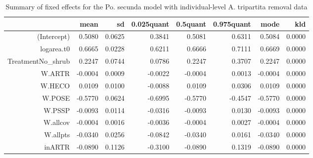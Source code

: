 \begin{table}[ht]
\centering
\caption{Summary of fixed effects for the Po. secunda model with individual-level A. tripartita removal data} 
\label{POSEgrowth-inARTR}
\begin{tabular}{rrrrrrrr}
  \hline
 & mean & sd & 0.025quant & 0.5quant & 0.975quant & mode & kld \\ 
  \hline
(Intercept) & 0.5080 & 0.0625 & 0.3841 & 0.5081 & 0.6311 & 0.5084 & 0.0000 \\ 
  logarea.t0 & 0.6665 & 0.0228 & 0.6211 & 0.6666 & 0.7111 & 0.6669 & 0.0000 \\ 
  TreatmentNo\_shrub & 0.2247 & 0.0744 & 0.0786 & 0.2247 & 0.3707 & 0.2247 & 0.0000 \\ 
  W.ARTR & -0.0004 & 0.0009 & -0.0022 & -0.0004 & 0.0013 & -0.0004 & 0.0000 \\ 
  W.HECO & 0.0109 & 0.0100 & -0.0088 & 0.0109 & 0.0306 & 0.0109 & 0.0000 \\ 
  W.POSE & -0.5770 & 0.0624 & -0.6995 & -0.5770 & -0.4547 & -0.5770 & 0.0000 \\ 
  W.PSSP & -0.0093 & 0.0114 & -0.0316 & -0.0093 & 0.0130 & -0.0093 & 0.0000 \\ 
  W.allcov & -0.0004 & 0.0016 & -0.0036 & -0.0004 & 0.0027 & -0.0004 & 0.0000 \\ 
  W.allpts & -0.0340 & 0.0256 & -0.0842 & -0.0340 & 0.0161 & -0.0340 & 0.0000 \\ 
  inARTR & -0.0890 & 0.1126 & -0.3100 & -0.0890 & 0.1319 & -0.0890 & 0.0000 \\ 
   \hline
\end{tabular}
\end{table}

